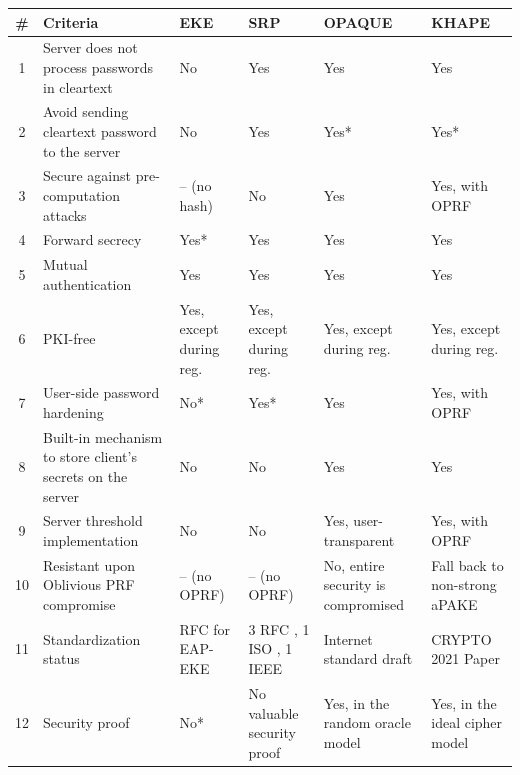 ﻿\documentclass[../report.tex]{subfiles}
\begin{document}
\begin{center}
   \begin{tabular}{ | c | p{5cm} || p{2cm} | p{2cm} | p{2cm} | p{2cm} | }
     \hline
     \textbf{\#} & \textbf{Criteria} & \textbf{EKE} & \textbf{SRP} & \textbf{OPAQUE} & \textbf{KHAPE} \\ \hline
     
     
     
     1 & Server does not process passwords in cleartext & No & Yes & Yes & Yes \\ \hline
     2 & Avoid sending cleartext password to the server & No & Yes & Yes* & Yes* \\ \hline
     
     3 & Secure against pre-computation attacks & -- (no hash) & No & Yes & Yes, with OPRF \\ \hline
     4 & Forward secrecy & Yes* & Yes & Yes & Yes \\ \hline
     5 & Mutual authentication & Yes & Yes & Yes & Yes \\ \hline
     6 & PKI-free & Yes, except during reg. & Yes, except during reg. & Yes, except during reg. & Yes, except during reg. \\ \hline
     7 & User-side password hardening & No* & Yes* & Yes & Yes, with OPRF \\ \hline
     8 & Built-in mechanism to store client's secrets on the server & No & No & Yes & Yes \\ \hline
     9 & Server threshold implementation & No & No & Yes, user-transparent & Yes, with OPRF \\ \hline
     10 & Resistant upon Oblivious PRF compromise & -- (no OPRF) & -- (no OPRF) & No, entire security is compromised & Fall back to non-strong aPAKE \\ \hline
     11 & Standardization status & RFC for EAP-EKE \cite{EAP_EKE_RFC} & 3 RFC \cite{SRP_RFC_1, SRP_RFC_2, SRP_RFC_3}, 1 ISO \cite{SRP_ISO}, 1 IEEE \cite{SRP_IEEE} & Internet standard draft \cite{OPAQUE_Standard_Draft} & CRYPTO 2021 Paper \cite{KHAPE_Paper} \\ \hline
     12 & Security proof & No* & No valuable security proof & Yes, in the random oracle model & Yes, in the ideal cipher model \\ \hline
     
     \end{tabular}
 \end{center}
 
\end{document}
